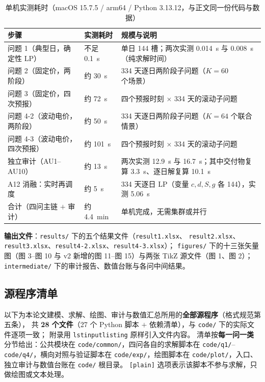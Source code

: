 \begin{table}[htbp]
  \centering
  \caption{单机实测耗时（macOS 15.7.5 / arm64 / Python 3.13.12，与正文同一份代码与数据）}
  \label{tab:runtime}
  \footnotesize
  \begin{tabularx}{\linewidth}{L{4.0cm} L{2.0cm} Y}
    \toprule
    步骤 & 实测耗时 & 规模与说明 \\
    \midrule
    问题 1（典型日，确定性 LP） & 不足 0.1~s & 单日 144 槽；两次实测 0.014~s 与 0.008~s（纯求解时间） \\
    问题 2（固定价，两阶段） & 约 30~s & 334 天逐日两阶段子问题（$K=60$ 个场景） \\
    问题 3（固定价，四次预报） & 约 72~s & 四个预报时刻 $\times$ 334 天的滚动子问题 \\
    问题 4-2（波动电价，两阶段） & 约 50~s & 334 天逐日两阶段子问题（$K=64$ 个联合情景） \\
    问题 4-3（波动电价，四次预报） & 约 101~s & 四个预报时刻 $\times$ 334 天的滚动子问题 \\
    独立审计（AU1--AU10） & 约 13~s & 两次实测 12.9~s 与 16.7~s；其中交付物复算 3.3~s、逐日解复算 10.1~s \\
    \midrule
    A12 消融：实时再调度 & 约 5~s & 334 天逐日 LP（变量 $c,d,S,g$ 各 144），实测 5.06~s \\
    \midrule
    合计（四问主链 $+$ 审计） & 约 4.4~min & 单机完成，无需集群或并行 \\
    \bottomrule
  \end{tabularx}
\end{table}

\noindent\textbf{输出文件}：\texttt{results/} 下的五个结果文件（\texttt{result1.xlsx}、
\texttt{result2.xlsx}、\texttt{result3.xlsx}、\texttt{result4-2.xlsx}、\texttt{result4-3.xlsx}）；
\texttt{figures/} 下的十三张矢量图（图 3--图 10 与 v2 新增的图 11--图 15）与两张 TikZ 源文件（图 1、图 2）；
\texttt{intermediate/} 下的审计报告、数值台账与各问中间结果。

\subsection{源程序清单}\label{sec:app-code}

以下为本论文建模、求解、绘图、审计与数值汇总所用的\textbf{全部源程序}（格式规范第五条），
共 \textbf{28 个文件}（27 个 Python 脚本 $+$ 依赖清单），与 \texttt{code/} 下的实际文件逐项一致；
附录用 \texttt{lstinputlisting} 原样引入文件内容。
清单按\textbf{每一问一类}分节给出：公共模块在 \texttt{code/common/}，四问各自的求解脚本在
\texttt{code/q1/}--\texttt{code/q4/}，横向对照与验证脚本在 \texttt{code/exp/}，绘图脚本在
\texttt{code/plot/}，入口、独立审计与数值台账在 \texttt{code/} 根目录。
\texttt{[plain]} 选项表示该脚本不参与求解，只做绘图或文本处理。

